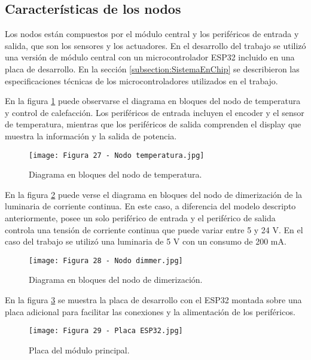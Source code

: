 \subsection{Características de los nodos}

Los nodos están compuestos por el módulo central y los periféricos de entrada y salida, que son los sensores y los actuadores. En el desarrollo del trabajo se utilizó una versión de módulo central con un microcontrolador ESP32 incluido en una placa de desarrollo. En la sección \ref{subsection:SistemaEnChip} se describieron las especificaciones técnicas de los microcontroladores utilizados en el trabajo.

En la figura \ref{fig:27} puede observarse el diagrama en bloques del nodo de temperatura y control de calefacción. Los periféricos de entrada incluyen el encoder y el sensor de temperatura, mientras que los periféricos de salida comprenden el display que muestra la información y la salida de potencia.

\newpage
\begin{figure}[h]
\centering
\texttt{[image: Figura 27 - Nodo temperatura.jpg]}
\caption[Diagrama en bloques del nodo de temperatura]{Diagrama en bloques del nodo de temperatura.}
\label{fig:27}
\end{figure}

En la figura \ref{fig:28} puede verse el diagrama en bloques del nodo de dimerización de la luminaria de corriente continua. En este caso, a diferencia del modelo descripto anteriormente, posee un solo periférico de entrada y el periférico de salida controla una tensión de corriente continua que puede variar entre 5 y 24 V. En el caso del trabajo se utilizó una luminaria de 5 V con un consumo de 200 mA.

\begin{figure}[h]
\centering
\texttt{[image: Figura 28 - Nodo dimmer.jpg]}
\caption[Diagrama en bloques del nodo de dimerización]{Diagrama en bloques del nodo de dimerización.}
\label{fig:28}
\end{figure}

En la figura \ref{fig:29} se muestra la placa de desarrollo con el ESP32 montada sobre una placa adicional para facilitar las conexiones y la alimentación de los periféricos. 

\begin{figure}[h]
\centering
\texttt{[image: Figura 29 - Placa ESP32.jpg]}
\caption[Placa del módulo principal]{Placa del módulo principal.}
\label{fig:29}
\end{figure}

